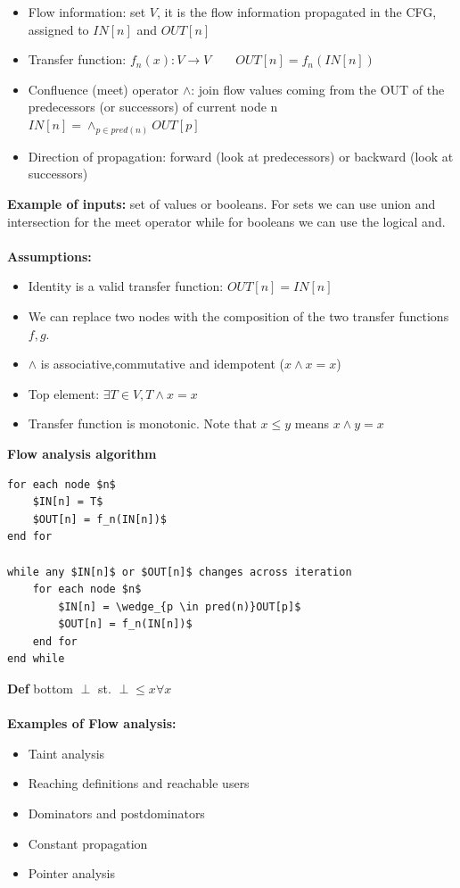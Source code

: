 \documentclass[10pt,a4paper]{article}
\begin{document}
\begin{itemize}
\item Flow information: set $V$, it is the flow information propagated in the CFG, assigned to $IN[n]$ and $OUT[n]$
\item Transfer function: $f_n(x): V \to V \hspace{2em} OUT[n]= f_n(IN[n])$
\item Confluence (meet) operator $\wedge$: join flow values coming from the OUT of the predecessors (or successors) of current node n\\
$ IN[n] = \wedge_{p \in pred(n)}OUT[p]$
\item Direction of propagation: forward (look at predecessors) or backward (look at successors)
\end{itemize}
\textbf{Example of inputs:} set of values or booleans. For sets we can use union and intersection for the meet operator while for booleans we can use the logical and.\\\\
\textbf{Assumptions:}
\begin{itemize}
\item Identity is a valid transfer function: $OUT[n] = IN[n]$
\item We can replace two nodes with the composition of the two transfer functions $f,g$.
\item $\wedge$ is associative,commutative and idempotent ($x \wedge x = x$)
\item Top element: $\exists T \in V,T \wedge x = x$
\item Transfer function is monotonic. Note that $x \leq y$ means $x \wedge y = x$
\end{itemize}
\textbf{Flow analysis algorithm}
\begin{lstlisting}[frame=lines]
for each node $n$
	$IN[n] = T$
	$OUT[n] = f_n(IN[n])$
end for

while any $IN[n]$ or $OUT[n]$ changes across iteration
	for each node $n$
		$IN[n] = \wedge_{p \in pred(n)}OUT[p]$
		$OUT[n] = f_n(IN[n])$
	end for
end while
\end{lstlisting}
\textbf{Def} bottom $\perp$ st. $\perp \leq x \forall x$\\\\
\textbf{Examples of Flow analysis:}
\begin{itemize}
\item Taint analysis
\item Reaching definitions and reachable users
\item Dominators and postdominators
\item Constant propagation
\item Pointer analysis
\end{itemize}
\end{document}
